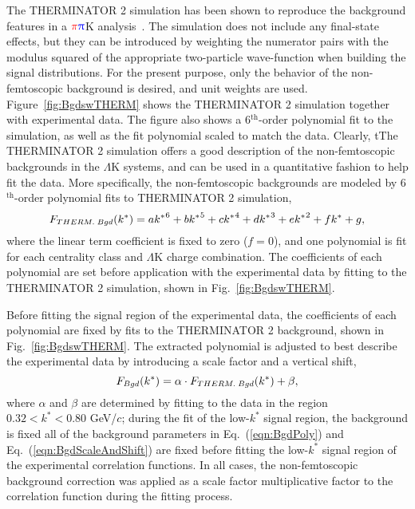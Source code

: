 \documentclass[ALICE,manyauthors]{cernphprep}
\newcommand{\kstar}{$k^{*}$\xspace}
\newcommand{\LamK}{$\Lambda$K\xspace}
\begin{document}
The THERMINATOR 2 simulation has been shown to reproduce the background features in a ${\color{red}\pi}{\color{blue}\uppi}$K analysis~\cite{Kisiel:2017}. 
{\color{red}The simulation does not include any final-state effects, but they can be introduced by weighting the numerator pairs with the modulus squared of the appropriate two-particle wave-function when building the signal distributions. 
For the present purpose, only the behavior of the non-femtoscopic background is desired, and unit weights are used.}
Figure~\ref{fig:BgdswTHERM} shows the THERMINATOR 2 simulation together with experimental data.  
The figure also shows a 6$^{\mathrm{th}}$-order polynomial fit to the simulation, as well as the fit polynomial scaled to match the data.
{\color{blue}Clearly, t}{\color{red}T}he THERMINATOR 2 simulation offers a good description of the non-femtoscopic backgrounds in the \LamK systems, and can be used in a quantitative fashion to help fit the data.
More specifically, the non-femtoscopic backgrounds are modeled by 6$^{\mathrm{th}}$-order polynomial fits to THERMINATOR 2 simulation,
\begin{equation}
F_{\scaleto{THERM.\; Bgd}{6pt}}(k^{*}) = a{k^{*}}^{6}+ b{k^{*}}^{5} + c{k^{*}}^{4} + d{k^{*}}^{3} + e{k^{*}}^{2} + fk^{*} + g,
\label{eqn:BgdPoly}
\end{equation}
where the linear term coefficient is fixed to zero ($f=0$), and one polynomial is fit for each centrality class and \LamK charge combination.
{\color{red}The coefficients of each polynomial are set before application with the experimental data by fitting to the THERMINATOR 2 simulation, shown in Fig.~\ref{fig:BgdswTHERM}.}

{\color{blue}Before fitting the signal region of the experimental data, the coefficients of each polynomial are fixed by fits to the THERMINATOR 2 background, shown in Fig.~\ref{fig:BgdswTHERM}.}
The extracted polynomial is adjusted to best describe the experimental data by introducing a scale factor and a vertical shift,
\begin{equation}
F_{\scaleto{Bgd}{6pt}}(k^{*}) = \alpha\cdot F_{\scaleto{THERM.\; Bgd}{6pt}}(k^{*}) + \beta,
\label{eqn:BgdScaleAndShift}
\end{equation}
where $\alpha$ and $\beta$ are determined by fitting to the data in the region $0.32 < k^{*} < 0.80$ GeV/$c$; {\color{red}during the fit of the low-\kstar signal region, the background is fixed} {\color{blue}all of the background parameters in Eq.~(\ref{eqn:BgdPoly}) and Eq.~(\ref{eqn:BgdScaleAndShift}) are fixed before fitting the low-\kstar signal region of the experimental correlation functions}.
In all cases, the non-femtoscopic background correction was applied as a {\color{red}scale factor} {\color{blue}multiplicative factor to the correlation function during the fitting process}.
\end{document}
